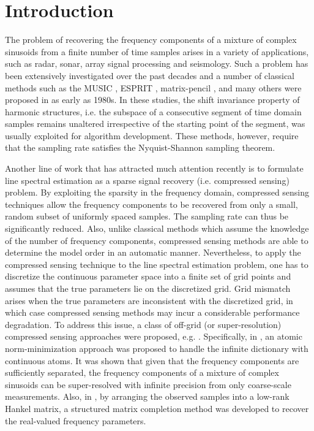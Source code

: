 \documentclass[10pt,journal,epsfig]{IEEEtran}
\begin{document}
\section{Introduction}
The problem of recovering the frequency components of a mixture of
complex sinusoids from a finite number of time samples arises in a
variety of applications, such as radar, sonar, array signal
processing and seismology. Such a problem has been extensively
investigated over the past decades and a number of classical
methods such as the MUSIC \cite{Schmidt86}, ESPRIT
\cite{RoyKailath89}, matrix-pencil \cite{HuaSarkar90}, and many
others were proposed in as early as 1980s. In these studies, the
shift invariance property of harmonic structures, i.e. the
subspace of a consecutive segment of time domain samples remains
unaltered irrespective of the starting point of the segment, was
usually exploited for algorithm development. These methods,
however, require that the sampling rate satisfies the
Nyquist-Shannon sampling theorem.





Another line of work that has attracted much attention recently is
to formulate line spectral estimation as a sparse signal recovery
(i.e. compressed sensing) problem. By exploiting the sparsity in
the frequency domain, compressed sensing techniques allow the
frequency components to be recovered from only a small, random
subset of uniformly spaced samples. The sampling rate can thus be
significantly reduced. Also, unlike classical methods
\cite{Schmidt86,RoyKailath89,HuaSarkar90} which assume the
knowledge of the number of frequency components, compressed
sensing methods are able to determine the model order in an
automatic manner. Nevertheless, to apply the compressed sensing
technique to the line spectral estimation problem, one has to
discretize the continuous parameter space into a finite set of
grid points and assumes that the true parameters lie on the
discretized grid. Grid mismatch arises when the true parameters
are inconsistent with the discretized grid, in which case
compressed sensing methods may incur a considerable performance
degradation. To address this issue, a class of off-grid (or
super-resolution) compressed sensing approaches were proposed,
e.g.
\cite{HuShi12,YangXie13,CandesGranda14,TangBhaskar13,BhaskarTang13}.
Specifically, in \cite{CandesGranda14,TangBhaskar13}, an atomic
norm-minimization approach was proposed to handle the infinite
dictionary with continuous atoms. It was shown that given that the
frequency components are sufficiently separated, the frequency
components of a mixture of complex sinusoids can be super-resolved
with infinite precision from only coarse-scale measurements. Also,
in \cite{ChenChi14,CaiLiu15}, by arranging the observed samples
into a low-rank Hankel matrix, a structured matrix completion
method was developed to recover the real-valued frequency
parameters.
\end{document}
